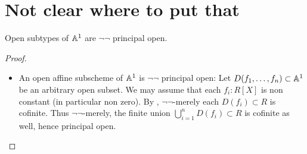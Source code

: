 \documentclass{article}
\begin{document}
\section{Not clear where to put that}
\begin{lemma}
	Open subtypes of $\mathbb{A}^1$ are $\lnot \lnot$ principal open. %
\end{lemma}
\begin{proof}
	\begin{itemize}
		\item An open affine subscheme of $\mathbb{A}^1$ is $\lnot \lnot$ principal open: Let $D(f_1,\hdots,f_n) \subset \mathbb{A}^1$ be an arbitrary open subset. We may assume that each $f_i : R[X]$ is non constant (in particular non zero). By \todocite, $\lnot \lnot$-merely each $D(f_i) \subset R$ is cofinite. Thus $\lnot \lnot$-merely, the finite union $\bigcup_{i=1}^n D(f_i) \subset R$ is cofinite as well, hence principal open. %
	\end{itemize}
\end{proof}
\end{document}
